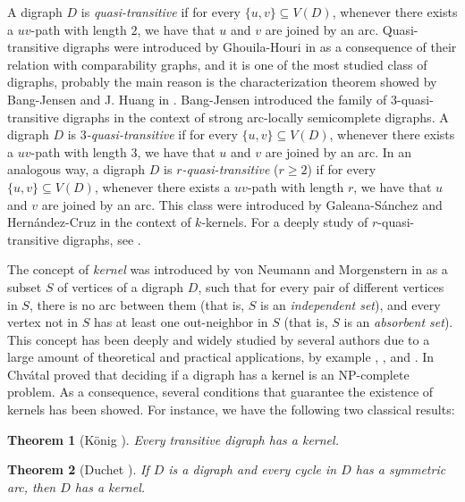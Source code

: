 \documentclass[10pt,a4paper]{article}
\newtheorem{theorem}{Theorem}[section]
\begin{document}
A digraph $D$ is \textit{quasi-transitive} if for every $\{u,v\} \subseteq V(D)$, whenever there exists a $uv$-path with length $2$, we have that $u$ and $v$ are joined by an arc.
 Quasi-transitive digraphs were introduced by Ghouila-Houri in \cite{quasitrans} as a consequence of their relation with comparability graphs, and it is one of the most studied class of digraphs, probably the main reason is the characterization theorem showed by Bang-Jensen and J. Huang in \cite{qtranschar}. 
 Bang-Jensen \cite{3transintro} introduced the family of $3$-quasi-transitive digraphs in the context of strong arc-locally semicomplete digraphs. A digraph $D$ is \textit{$3$-quasi-transitive} if for every $\{u,v\} \subseteq V(D)$, whenever there exists a $uv$-path with length $3$, we have that $u$ and $v$ are joined by an arc. In an analogous way, a digraph $D$ is \emph{$r$-quasi-transitive} ($r \geq 2$) if for every $\{u,v\} \subseteq V(D)$, whenever there exists a $uv$-path with length $r$, we have that $u$ and $v$ are joined by an arc. This class  were introduced by Galeana-Sánchez and Hernández-Cruz \cite{qtrans1} in the context of $k$-kernels.  For a deeply study of $r$-quasi-transitive digraphs, see \cite{bangjen}. 

The concept of \emph{kernel} was introduced by von Neumann and Morgenstern in \cite{2} as a subset $S$ of vertices of a digraph $D$, such that for every pair of different vertices in $S$, there is no arc between them (that is, $S$ is an \emph{independent set}), and every vertex not in $S$ has at least one out-neighbor in $S$ (that is, $S$ is an \emph{absorbent set}). This concept has been deeply and widely studied by several authors due to a large amount of theoretical and practical applications, by example \cite{ker1}, \cite{ker2}, \cite{ker3} and \cite{ker4}. 
In \cite{3} Chvátal proved that deciding if a digraph has a kernel is an NP-complete problem. As a consequence, several conditions that guarantee the existence of kernels has been showed. For instance, we have the following two classical results:

\begin{theorem}[König \cite{kon}]
\label{kertrans}
Every transitive digraph has a kernel.
\end{theorem}

\begin{theorem}[Duchet \cite{duch}]
\label{duchet}
If $D$ is a digraph and every cycle in $D$ has a symmetric arc, then $D$ has a kernel.
\end{theorem}
\end{document}
